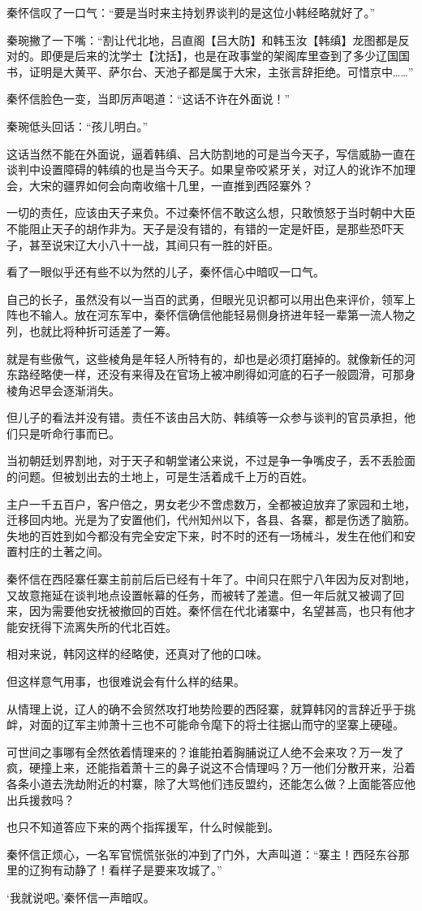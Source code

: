 秦怀信叹了一口气：“要是当时来主持划界谈判的是这位小韩经略就好了。”

秦琬撇了一下嘴：“割让代北地，吕直阁【吕大防】和韩玉汝【韩缜】龙图都是反对的。即便是后来的沈学士【沈括】，也是在政事堂的架阁库里查到了多少辽国国书，证明是大黄平、萨尔台、天池子都是属于大宋，主张言辞拒绝。可惜京中……”

秦怀信脸色一变，当即厉声喝道：“这话不许在外面说！”

秦琬低头回话：“孩儿明白。”

这话当然不能在外面说，逼着韩缜、吕大防割地的可是当今天子，写信威胁一直在谈判中设置障碍的韩缜的也是当今天子。如果皇帝咬紧牙关，对辽人的讹诈不加理会，大宋的疆界如何会向南收缩十几里，一直推到西陉寨外？

一切的责任，应该由天子来负。不过秦怀信不敢这么想，只敢愤怒于当时朝中大臣不能阻止天子的胡作非为。天子是没有错的，有错的一定是奸臣，是那些恐吓天子，甚至说宋辽大小八十一战，其间只有一胜的奸臣。

看了一眼似乎还有些不以为然的儿子，秦怀信心中暗叹一口气。

自己的长子，虽然没有以一当百的武勇，但眼光见识都可以用出色来评价，领军上阵也不输人。放在河东军中，秦怀信确信他能轻易侧身挤进年轻一辈第一流人物之列，也就比将种折可适差了一筹。

就是有些傲气，这些棱角是年轻人所特有的，却也是必须打磨掉的。就像新任的河东路经略使一样，还没有来得及在官场上被冲刷得如河底的石子一般圆滑，可那身棱角迟早会逐渐消失。

但儿子的看法并没有错。责任不该由吕大防、韩缜等一众参与谈判的官员承担，他们只是听命行事而已。

当初朝廷划界割地，对于天子和朝堂诸公来说，不过是争一争嘴皮子，丢不丢脸面的问题。但被划出去的土地上，可是生活着成千上万的百姓。

主户一千五百户，客户倍之，男女老少不啻虑数万，全都被迫放弃了家园和土地，迁移回内地。光是为了安置他们，代州知州以下，各县、各寨，都是伤透了脑筋。失地的百姓到如今都没有完全安定下来，时不时的还有一场械斗，发生在他们和安置村庄的土著之间。

秦怀信在西陉寨任寨主前前后后已经有十年了。中间只在熙宁八年因为反对割地，又故意拖延在谈判地点设置帐幕的任务，而被转了差遣。但一年后就又被调了回来，因为需要他安抚被撤回的百姓。秦怀信在代北诸寨中，名望甚高，也只有他才能安抚得下流离失所的代北百姓。

相对来说，韩冈这样的经略使，还真对了他的口味。

但这样意气用事，也很难说会有什么样的结果。

从情理上说，辽人的确不会贸然攻打地势险要的西陉寨，就算韩冈的言辞近乎于挑衅，对面的辽军主帅萧十三也不可能命令麾下的将士往据山而守的坚寨上硬碰。

可世间之事哪有全然依着情理来的？谁能拍着胸脯说辽人绝不会来攻？万一发了疯，硬撞上来，还能指着萧十三的鼻子说这不合情理吗？万一他们分散开来，沿着各条小道去洗劫附近的村寨，除了大骂他们违反盟约，还能怎么做？上面能答应他出兵援救吗？

也只不知道答应下来的两个指挥援军，什么时候能到。

秦怀信正烦心，一名军官慌慌张张的冲到了门外，大声叫道：“寨主！西陉东谷那里的辽狗有动静了！看样子是要来攻城了。”

‘我就说吧。’秦怀信一声暗叹。

